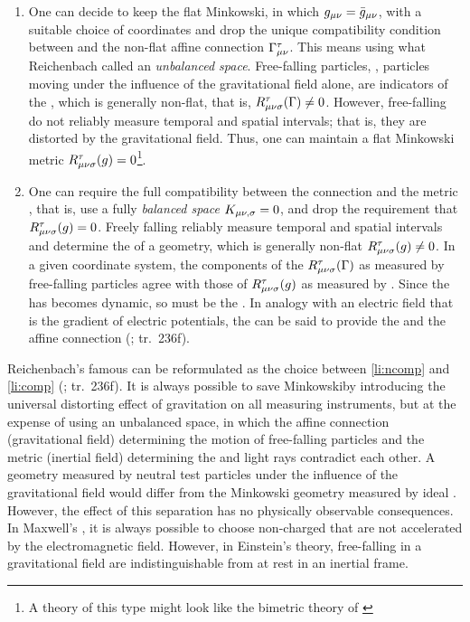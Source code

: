 \documentclass[submitted]{article}
\renewcommand{\Mink}{Minkowski\xspace}
\renewcommand{\rzlp}[2]{(\cite[#1]{Reichenbach1928}; tr.\ #2)\xspace}
\begin{document}
\begin{enumerate}[label=(\alph*)] 
 \item \label{li:ncomp} One can decide to keep the flat \Mink \spti, in which $g_{\mu\nu}=\bar{g}_{\mu\nu}$, with a suitable choice of coordinates and drop the unique compatibility condition between \gmn and the non-flat affine connection $\Gamma^\tau_{\mu\nu}$. This means using what Reichenbach called an \emph{unbalanced space}. Free-falling particles, \thatis, particles moving under the influence of the gravitational field alone, are indicators of the \Gtmn, which is generally non-flat, that is, $R_{\mu \nu \sigma}^{\tau}(\Gamma) \neq 0$. However, free-falling \rac do not reliably measure temporal and spatial intervals; that is, they are distorted by the gravitational field. Thus, one can maintain a flat \Mink metric $R_{\mu \nu \sigma}^{\tau} (g)=0$\footnote{A theory of this type might look like the bimetric theory of \cite{Rosen1940,Rosen1940a}}.
 
\item \label{li:comp} One can require the full compatibility between the connection \Gtmn and the metric \gmn, that is, use a fully \emph{balanced space} $K_{\mu \nu, \sigma} = 0$, and drop the requirement that $R_{\mu \nu \sigma}^{\tau} (g)=0$. Freely falling \rac reliably measure temporal and spatial intervals and determine the \gmn of a geometry, which is generally non-flat $R_{\mu \nu \sigma}^{\tau} (g) \neq 0$. In a given coordinate system, the components of the $R_{\mu \nu \sigma}^{\tau}(\Gamma)$ as measured by free-falling particles agree with those of $R_{\mu \nu \sigma}^{\tau} (g)$ as measured by \rac. Since the \Gtmn has becomes dynamic, so must be the \gmn. In analogy with an electric field that is the gradient of electric potentials, the \gmn can be said to provide the  and the affine connection  \rzlp{271f}{236f}.
\end{enumerate}
%
Reichenbach's famous  can be reformulated as the choice between \cref{li:ncomp} and \cref{li:comp} \rzlp{271f}{236f}. It is always possible to save \Mink \spti by introducing the universal distorting effect of gravitation on all measuring instruments, but at the expense of using an unbalanced space, in which the affine connection (gravitational field) determining the motion of free-falling particles and the metric (inertial field) determining the \rac and light rays contradict each other. A  geometry measured by neutral test particles under the influence of the gravitational field would differ from the  \Mink geometry measured by ideal \rac \citep{Stachel2007}. However, the effect of this separation has no physically observable consequences. In Maxwell's \ed, it is always possible to choose non-charged \rac that are not accelerated by the electromagnetic field. However, in Einstein's theory, \rac free-falling in a gravitational field are indistinguishable from \rac at rest in an inertial frame.
\end{document}
